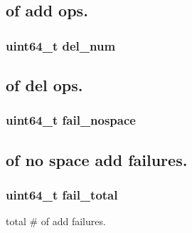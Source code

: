 \subsection*{of add ops.}\hypertarget{structip__frag__tbl__stat_abf11b6a21840e57c393c2011a29e37fc}{}
\subsubsection[{del\+\_\+num}]{\setlength{\rightskip}{0pt plus 5cm}uint64\+\_\+t del\+\_\+num}\label{structip__frag__tbl__stat_abf11b6a21840e57c393c2011a29e37fc}
\subsection*{of del ops.}\hypertarget{structip__frag__tbl__stat_a7c1bf4c99fc9c7c9b97a54ae5e3cd149}{}
\subsubsection[{fail\+\_\+nospace}]{\setlength{\rightskip}{0pt plus 5cm}uint64\+\_\+t fail\+\_\+nospace}\label{structip__frag__tbl__stat_a7c1bf4c99fc9c7c9b97a54ae5e3cd149}
\subsection*{of \textquotesingle{}no space\textquotesingle{} add failures.}\hypertarget{structip__frag__tbl__stat_a5d345175f24e51ef3e82caa9a29211cc}{}
\subsubsection[{fail\+\_\+total}]{\setlength{\rightskip}{0pt plus 5cm}uint64\+\_\+t fail\+\_\+total}\label{structip__frag__tbl__stat_a5d345175f24e51ef3e82caa9a29211cc}
total \# of add failures. \hypertarget{structip__frag__tbl__stat_acb8aad396c4da244c3da7858b23296a9}{}
